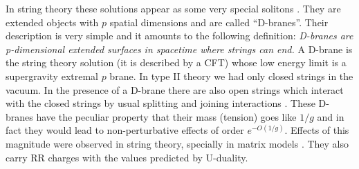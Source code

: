 In 
string theory these solutions appear as some very 
special solitons \daipol \polchinski .
They are extended objects with $p$ spatial dimensions and
are called ``D-branes''.
Their description is very simple and it amounts
to the following definition: 
{ \it D-branes are p-dimensional extended surfaces in spacetime 
where strings can end.} A D-brane is the string theory
solution (it is described by  a CFT)
 whose low energy limit is a supergravity 
extremal $p$ brane. 
In type II theory we had only closed strings in the
vacuum. In the presence of a D-brane there are also
open strings which interact with the closed strings
by usual splitting and joining interactions \GSW . 
These D-branes have the peculiar property that their
mass (tension) goes like $ 1/g $ and in fact they would
lead to  non-perturbative
effects of  order $e^{-O(1/g)}$. Effects  of this 
 magnitude were observed in string
theory, specially in matrix models \shenker . They also carry 
RR charges with the values predicted by U-duality. 



